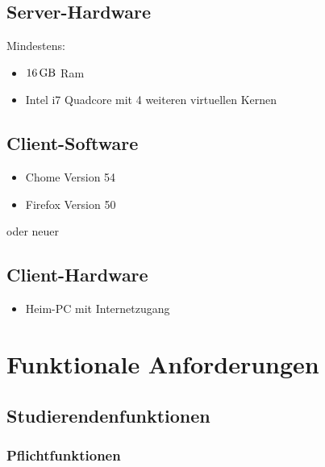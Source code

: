 \documentclass[parskip=full]{scrartcl}
\begin{document}
\subsection{Server-Hardware}
Mindestens:
\begin{itemize} 
  \item $\SI{16}{\giga\byte}$ Ram
  \item Intel i7 Quadcore mit 4 weiteren virtuellen Kernen 
\end{itemize}

\subsection{Client-Software}
\begin{itemize}
  \item Chome Version 54
  \item Firefox Version 50
\end{itemize}
oder neuer
\subsection{Client-Hardware}
\begin{itemize}
  \item Heim-PC mit Internetzugang
\end{itemize}
\section{Funktionale Anforderungen}

\subsection{Studierendenfunktionen}

\subsubsection{Pflichtfunktionen}
\end{document}
